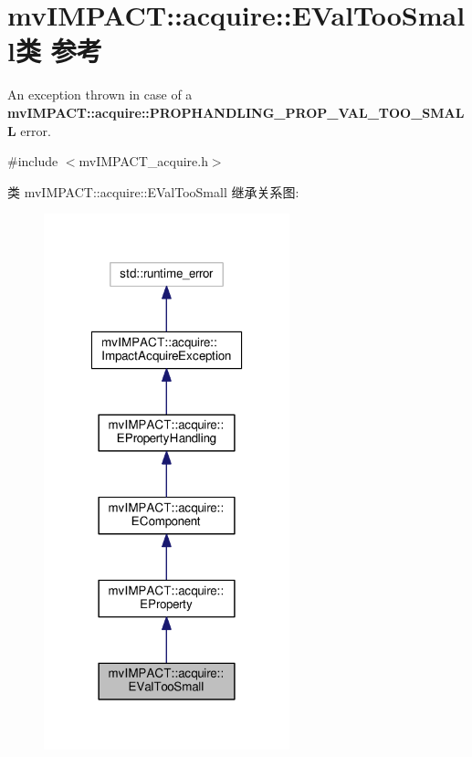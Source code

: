 \hypertarget{classmv_i_m_p_a_c_t_1_1acquire_1_1_e_val_too_small}{\section{mv\+I\+M\+P\+A\+C\+T\+:\+:acquire\+:\+:E\+Val\+Too\+Small类 参考}
\label{classmv_i_m_p_a_c_t_1_1acquire_1_1_e_val_too_small}
}


An exception thrown in case of a {\bfseries mv\+I\+M\+P\+A\+C\+T\+::acquire\+::\+P\+R\+O\+P\+H\+A\+N\+D\+L\+I\+N\+G\+\_\+\+P\+R\+O\+P\+\_\+\+V\+A\+L\+\_\+\+T\+O\+O\+\_\+\+S\+M\+A\+L\+L} error.  




{\ttfamily \#include $<$mv\+I\+M\+P\+A\+C\+T\+\_\+acquire.\+h$>$}



类 mv\+I\+M\+P\+A\+C\+T\+:\+:acquire\+:\+:E\+Val\+Too\+Small 继承关系图\+:
\nopagebreak
\begin{figure}[H]
\begin{center}
\leavevmode
\includegraphics[width=202pt]{classmv_i_m_p_a_c_t_1_1acquire_1_1_e_val_too_small__inherit__graph}
\end{center}
\end{figure}


